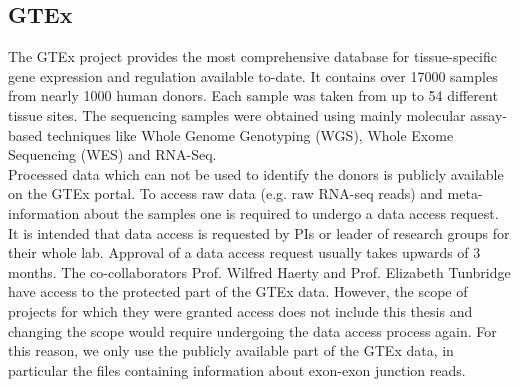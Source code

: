 \subsection{GTEx} \label{subsec:gtex}
The GTEx project provides the most comprehensive database for tissue-specific gene expression and regulation available to-date. It contains over 17000 samples from nearly 1000 human donors. Each sample was taken from up to 54 different tissue sites. The sequencing samples were obtained using mainly molecular assay-based techniques like Whole Genome Genotyping (WGS), Whole Exome Sequencing (WES) and RNA-Seq.\\
Processed data which can not be used to identify the donors is publicly available on the GTEx portal. To access raw data (e.g. raw RNA-seq reads) and meta-information about the samples one is required to undergo a data access request. It is intended that data access is requested by PIs or leader of research groups for their whole lab. Approval of a data access request usually takes upwards of 3 months. The co-collaborators Prof. Wilfred Haerty and Prof. Elizabeth Tunbridge have access to the protected part of the GTEx data. However, the scope of projects for which they were granted access does not include this thesis and changing the scope would require undergoing the data access process again. For this reason, we only use the publicly available part of the GTEx data, in particular the files containing information about exon-exon junction reads.
